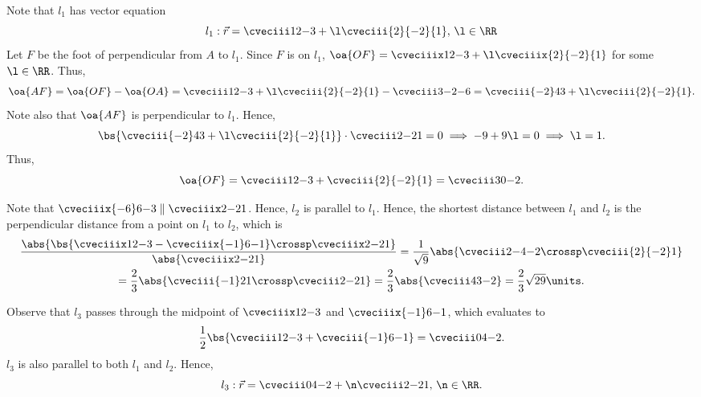 \begin{solution}
    \begin{ppart}
        Note that $l_1$ has vector equation
        \[
            l_1 : \vec r = \cveciii12{-3} + \l \cveciii{2}{-2}{1}, \, \l \in \RR
        \]
        Let $F$ be the foot of perpendicular from $A$ to $l_1$. Since $F$ is on $l_1$, $\oa{OF} = \cveciiix12{-3} + \l \cveciiix{2}{-2}{1}$ for some $\l \in \RR$.
        Thus, \[\oa{AF} = \oa{OF} - \oa{OA} = \cveciii12{-3} + \l \cveciii{2}{-2}{1} - \cveciii3{-2}{-6} = \cveciii{-2}43 + \l \cveciii{2}{-2}{1}.\] Note also that $\oa{AF}$ is perpendicular to $l_1$. Hence, \[\bs{\cveciii{-2}43 + \l \cveciii{2}{-2}{1}} \cdot \cveciii2{-2}1 = 0 \implies -9 + 9\l = 0 \implies \l = 1.\] Thus, \[\oa{OF} = \cveciii12{-3} + \cveciii{2}{-2}{1} = \cveciii30{-2}.\]
    \end{ppart}
    \begin{ppart}
        Note that $\cveciiix{-6}6{-3}\parallel \cveciiix2{-2}1$. Hence, $l_2$ is parallel to $l_1$. Hence, the shortest distance between $l_1$ and $l_2$ is the perpendicular distance from a point on $l_1$ to $l_2$, which is
        \begin{gather*}
            \frac{\abs{\bs{\cveciiix12{-3} - \cveciiix{-1}6{-1}} \crossp \cveciiix2{-2}1}}{\abs{\cveciiix2{-2}1}} = \frac1{\sqrt{9}} \abs{\cveciii2{-4}{-2} \crossp \cveciii{2}{-2}1}\\
            = \frac23 \abs{\cveciii{-1}21 \crossp \cveciii2{-2}1} = \frac23 \abs{\cveciii43{-2}} = \frac23 \sqrt{29} \units.
        \end{gather*}
    \end{ppart}
    \begin{ppart}
        Observe that $l_3$ passes through the midpoint of $\cveciiix12{-3}$ and $\cveciiix{-1}6{-1}$, which evaluates to \[\frac12 \bs{\cveciii12{-3} + \cveciii{-1}6{-1}} = \cveciii04{-2}.\] $l_3$ is also parallel to both $l_1$ and $l_2$. Hence, \[l_3 : \vec r = \cveciii04{-2} + \n \cveciii2{-2}1, \, \n \in \RR.\]
    \end{ppart}
\end{solution}


